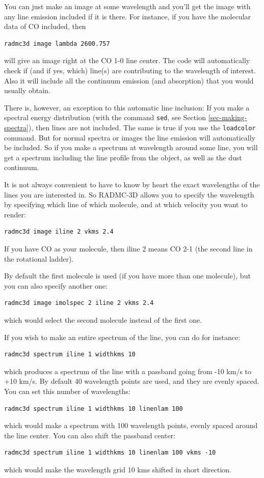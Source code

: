 \documentclass{report}
\begin{document}
You can just make an image at some wavelength and you'll get the image with
any line emission included if it is there. For instance, if you have 
the molecular data of CO included, then
{\small\begin{verbatim}
radmc3d image lambda 2600.757
\end{verbatim}}
will give an image right at the CO 1-0 line center. The code will automatically
check if (and if yes, which) line(s) are contributing to the wavelength of
interest. Also it will include all the continuum emission (and absorption)
that you would usually obtain. 

There is, however, an exception to this automatic line inclusion: If you
make a spectral energy distribution (with the command {\small\tt sed}, see
Section \ref{sec-making-spectra}), then lines are not included. The same is
true if you use the {\small\tt loadcolor} command.  But for normal spectra
or images the line emission will automatically be included.  So if you make
a spectrum at wavelength around some line, you will get a spectrum including
the line profile from the object, as well as the dust continuum.

It is not always convenient to have to know by heart the exact wavelengths
of the lines you are interested in. So RADMC-3D allows you to specify the
wavelength by specifying which line of which molecule, and at which velocity
you want to render:
{\small\begin{verbatim}
radmc3d image iline 2 vkms 2.4
\end{verbatim}}
If you have CO as your molecule, then iline 2 means CO 2-1 (the second
line in the rotational ladder). 

By default the first molecule is used (if you have more than one molecule),
but you can also specify another one:
{\small\begin{verbatim}
radmc3d image imolspec 2 iline 2 vkms 2.4
\end{verbatim}}
which would select the second molecule instead of the first one. 

If you wish to make an entire spectrum of the line, you can do for instance:
{\small\begin{verbatim}
radmc3d spectrum iline 1 widthkms 10
\end{verbatim}}
which produces a spectrum of the line with a passband going from -10 km/s to
+10 km/s. By default 40 wavelength points are used, and they are evenly
spaced. You can set this number of wavelengths:
{\small\begin{verbatim}
radmc3d spectrum iline 1 widthkms 10 linenlam 100
\end{verbatim}}
which would make a spectrum with 100 wavelength points, evenly spaced around
the line center. You can also shift the passband center:
{\small\begin{verbatim}
radmc3d spectrum iline 1 widthkms 10 linenlam 100 vkms -10
\end{verbatim}}
which would make the wavelength grid 10 kms shifted in short direction.
\end{document}
